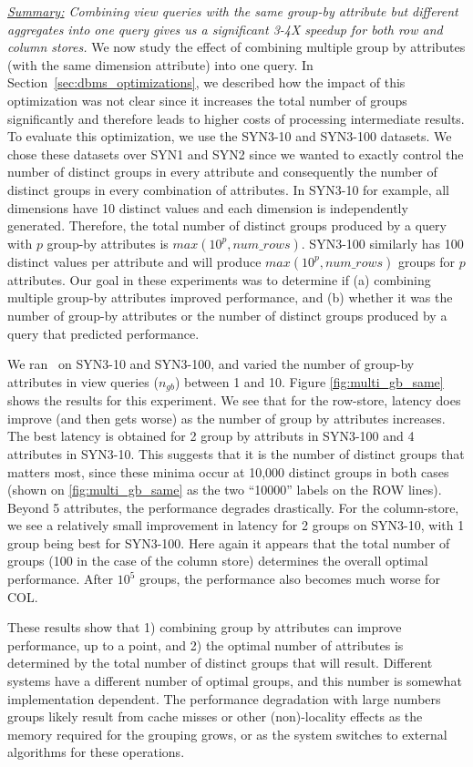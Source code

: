 {\em \underline{Summary:} Combining view queries with the same group-by attribute
but different aggregates into one query gives us a significant 
3-4X speedup for both row and column stores.}
We now study the effect of combining multiple group by attributes (with the
same dimension attribute) into one query.
In Section~\ref{sec:dbms_optimizations}, we described
 how the impact of this optimization was not
clear since it increases the total number of groups significantly and therefore
leads to higher costs of processing intermediate results.
To evaluate this optimization, we use the SYN3-10 and SYN3-100 datasets.
We chose these datasets over SYN1 and SYN2 since we wanted to exactly control
the number of distinct groups in every attribute and consequently the number of
distinct groups in every combination of attributes.
In SYN3-10 for example, all dimensions have 10 distinct values and each
dimension is independently generated. 
Therefore, the total number of distinct
groups produced by a query with $p$ group-by attributes is $max(10^p,
num\_rows)$.
SYN3-100 similarly has 100 distinct values per attribute and will produce
$max(10^p, num\_rows)$ groups for $p$ attributes.
Our goal in these experiments was to determine if (a) combining multiple
group-by attributes improved performance, and (b) whether it was the number of
group-by attributes or the number of distinct groups produced by a query that
predicted performance.

We ran \VizRecDB\ on SYN3-10 and SYN3-100, and varied the number of
group-by attributes in view queries ($n_{gb}$) between 1 and 10.
Figure \ref{fig:multi_gb_same} shows the results for this experiment.
We see that for the row-store, latency does improve (and then gets worse) as the
number of group by attributes increases.  The best latency is obtained for 2
group by attributs in SYN3-100 and 4 attributes in SYN3-10.  This suggests
that it is the number of distinct groups that matters most, since these minima occur at 
10,000 distinct groups in both cases (shown on \ref{fig:multi_gb_same} as the two ``10000'' labels on the ROW lines).
Beyond 5 attributes, the performance degrades drastically.  
 For the column-store, we see a
relatively small improvement in latency for 2 groups on SYN3-10, with 1 group being best for
SYN3-100.  Here again it appears that the total number of groups (100 in the case of the column store) determines
the overall optimal performance.
After $10^5$ groups, the performance also becomes much worse for COL.

These results show that 1) combining group by attributes can improve performance, up to a point, and 2) the optimal
number of attributes is determined by the total number of distinct groups that will result.  Different systems have a different
number of optimal groups, and this number is somewhat implementation dependent.  The performance degradation with
large numbers groups likely result from cache misses or other (non)-locality effects
as the memory required for the grouping grows, or as the system switches to external algorithms for these
operations.

